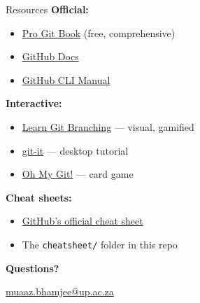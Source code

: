 \documentclass[aspectratio=169, 11pt]{beamer}
\begin{document}
\begin{frame}{Resources}
  \textbf{Official:}
  \begin{itemize}
    \item \href{https://git-scm.com/book/en/v2}{Pro Git Book} (free, comprehensive)
    \item \href{https://docs.github.com}{GitHub Docs}
    \item \href{https://cli.github.com/manual/}{GitHub CLI Manual}
  \end{itemize}

  \textbf{Interactive:}
  \begin{itemize}
    \item \href{https://learngitbranching.js.org/}{Learn Git Branching} --- visual, gamified
    \item \href{https://github.com/jlord/git-it-electron}{git-it} --- desktop tutorial
    \item \href{https://ohmygit.org/}{Oh My Git!} --- card game
  \end{itemize}

  \textbf{Cheat sheets:}
  \begin{itemize}
    \item \href{https://education.github.com/git-cheat-sheet-education.pdf}{GitHub's official cheat sheet}
    \item The \texttt{cheatsheet/} folder in this repo
  \end{itemize}

  \vspace{1em}
  \centering
  \Large\textbf{Questions?}

  \vspace{0.5em}
  \normalsize
  \href{mailto:muaaz.bhamjee@up.ac.za}{muaaz.bhamjee@up.ac.za}
\end{frame}
\end{document}

